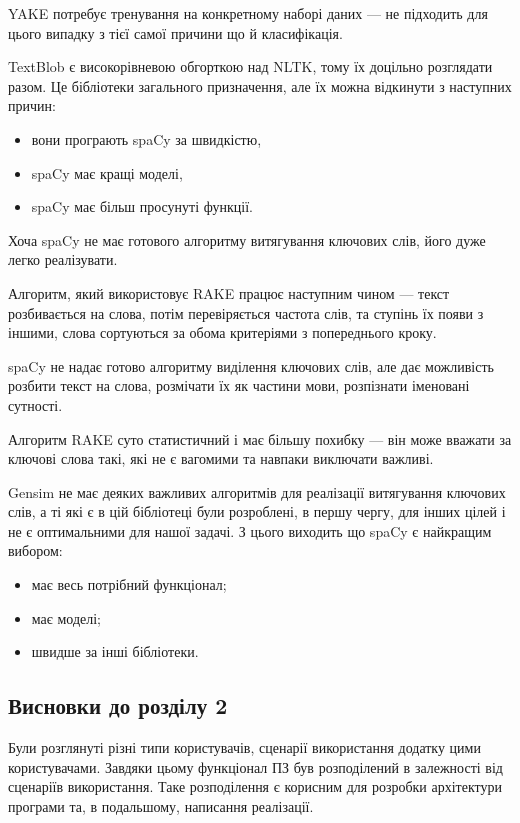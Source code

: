 \documentclass[14pt]{extarticle}
\newcommand{\unnumberedSubsection}[1]{%
  \subsection*{#1}%
  \addcontentsline{toc}{subsection}{#1}%
}
\begin{document}
  YAKE потребує тренування на конкретному наборі даних ---
  не підходить для цього випадку з тієї самої причини що й класифікація.

  TextBlob є високорівневою обгорткою над NLTK,
  тому їх доцільно розглядати разом.
  Це бібліотеки загального призначення,
  але їх можна відкинути з наступних причин:
  \begin{itemize}[labelindent=\dimexpr{}\relax, leftmargin=*]
    \item вони програють spaCy за швидкістю,
    \item spaCy має кращі моделі,
    \item spaCy має більш просунуті функції.
  \end{itemize}

  Хоча spaCy не має готового алгоритму витягування ключових слів,
  його дуже легко реалізувати.

  Алгоритм, який використовує RAKE працює наступним чином ---
  текст розбивається на слова, потім перевіряється частота слів,
  та ступінь їх появи з іншими,
  слова сортуються за обома критеріями з попереднього кроку.

  spaCy не надає готово алгоритму виділення ключових слів,
  але дає можливість розбити текст на слова, розмічати їх як частини мови,
  розпізнати іменовані сутності.

  Алгоритм RAKE суто статистичний і має більшу похибку ---
  він може вважати за ключові слова такі,
  які не є вагомими та навпаки виключати важливі.

  Gensim не має деяких важливих алгоритмів
  для реалізації витягування ключових слів,
  а ті які є в цій бібліотеці були розроблені, в першу чергу,
  для інших цілей і не є оптимальними для нашої задачі.
  З цього виходить що spaCy є найкращим вибором:
  \begin{itemize}[labelindent=\dimexpr{}\relax, leftmargin=*]
    \item має весь потрібний функціонал;
    \item має моделі;
    \item швидше за інші бібліотеки.
  \end{itemize}

  \unnumberedSubsection{Висновки до розділу 2}
  Були розглянуті різні типи користувачів,
  сценарії використання додатку цими користувачами.
  Завдяки цьому функціонал ПЗ був розподілений в залежності
  від сценаріїв використання.
  Таке розподілення є корисним для розробки архітектури програми та,
  в подальшому, написання реалізації.
\end{document}
